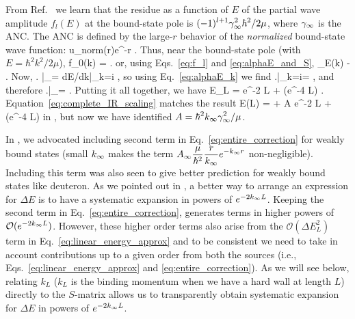 	From Ref.~\cite{taylor2006scattering} we learn that the residue as a
	function of $E$ of the partial wave amplitude $f_l(E)$ at the
	bound-state pole is $\displaystyle (-1)^{l+1} \gamma_\infty^2 \hbar^2/2 \mu$,
	where $\gamma_\infty$ is	the ANC.  The ANC is defined by the large-$r$ behavior of the
	\emph{normalized} bound-state wave function:
	\beq
	  u_{\rm norm}(r)\longrightarrow \ANC e^{-\kinf r}
	  \;.
	  \label{eq:definition_of_ANC}
	\eeq
	Thus, near the bound-state pole (with $E = \hbar^2 k^2/2\mu$),
	\beq
	  f_0(k)  \approx  {}
	      =  
	   \;.
	\eeq
	or, using Eqs.~\eqref{eq:f_l} and \eqref{eq:alphaE_and_S},
	\beq
	  \alpha_E(k) \approx -
	  \;.
	  \label{eq:alphaE_k}
	\eeq
	Now,
	\beq
	  \left.
	  \right|_{\Einf}=
	  {dE/dk|_{k=i\kinf}}
	  \;,
	\eeq
	so using Eq.~\eqref{eq:alphaE_k} we find
	\beq
	  \left.\right|_{k=i\kinf}=
	  \;,
	\eeq
	and therefore
	\beq
	  \left.\right|_{\Einf}=
	  \;.
	\eeq
	Putting it all together, we have
	\beq
	  \Delta E_L =  e^{-2 \kinf L}
	    + (e^{-4 \kinf L})
	    \;.
	    \label{eq:complete_IR_scaling}
	\eeq
	Equation~\eqref{eq:complete_IR_scaling} matches the result
	\beq
	E(L) = \Einf + A e^{-2 \kinf L} + (e^{-4 \kinf L})
	\label{eq:exp_L_extrapolation}
	\eeq
	in \cite{Furnstahl2012}, but now we have identified
	$\displaystyle A = \hbar^2k_{\infty}\gamma_\infty^2/\mu$.

	In \cite{More:2013rma}, we advocated including second term in
	Eq.~\eqref{eq:entire_correction} for weakly bound states (small $k_{\infty}$
	makes the term $\displaystyle A_{\infty} \frac{\mu}{\hbar^2}\frac{r}{k_{\infty}}
	e^{-k_{\infty} r}$
	non-negligible).  Including this term was also seen to give better prediction
	for weakly bound states like deuteron.  As we pointed out in
	\cite{Furnstahl:2013vda}, a better way to arrange an expression for
	$\Delta E$ is to have a systematic expansion in powers of $e^{-2 k_{\infty} L}$.
 	Keeping the second term in Eq.~\eqref{eq:entire_correction}, generates terms
	in higher powers of $\mathcal{O}(e^{-2 k_{\infty} L})$.  However, these higher
	order terms also arise from the $\mathcal{O}(\Delta E_L ^2)$ term in
	Eq.~\eqref{eq:linear_energy_approx} and to be consistent
	we need to take in account contributions up to a given order from both the
	sources (i.e., Eqs.~\eqref{eq:linear_energy_approx} and
	\eqref{eq:entire_correction}).  As we will see below, relating $k_L$
	($k_L$ is the binding momentum when we have a hard wall at length $L$)
	directly to the $S$-matrix allows us to transparently obtain systematic
	expansion for $\Delta E$ in powers of $e^{-2 k_{\infty} L}$.

